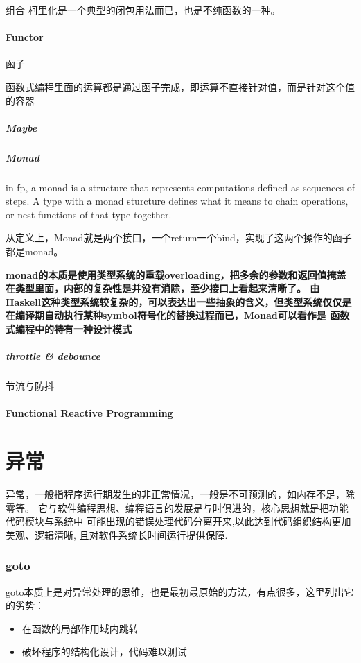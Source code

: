 组合
柯里化是一个典型的闭包用法而已，也是不纯函数的一种。

\paragraph{Functor}

函子

函数式编程里面的运算都是通过函子完成，即运算不直接针对值，而是针对这个值的容器

\subparagraph{Maybe}

\subparagraph{Monad}

in fp, a monad is a structure that represents computations defined as sequences of steps. 
A type with a monad sturcture defines what it means to chain operations, or nest functions of that type together.

从定义上，Monad就是两个接口，一个return一个bind，实现了这两个操作的函子都是monad。

\textbf{monad的本质是使用类型系统的重载overloading，把多余的参数和返回值掩盖在类型里面，内部的复杂性是并没有消除，至少接口上看起来清晰了。
由Haskell这种类型系统较复杂的，可以表达出一些抽象的含义，但类型系统仅仅是在编译期自动执行某种symbol符号化的替换过程而已，Monad可以看作是
函数式编程中的特有一种设计模式}

\subparagraph{throttle \& debounce}

节流与防抖


\paragraph{Functional Reactive Programming}



\section{异常}
异常，一般指程序运行期发生的非正常情况，一般是不可预测的，如内存不足，除零等。
它与软件编程思想、编程语言的发展是与时俱进的，核心思想就是把功能代码模块与系统中
可能出现的错误处理代码分离开来,以此达到代码组织结构更加美观、逻辑清晰,
且对软件系统长时间运行提供保障.

\subsubsection{goto}
goto本质上是对异常处理的思维，也是最初最原始的方法，有点很多，这里列出它的劣势：
\begin{itemize}
    \item {在函数的局部作用域内跳转}
    \item {破坏程序的结构化设计，代码难以测试}
\end{itemize}

